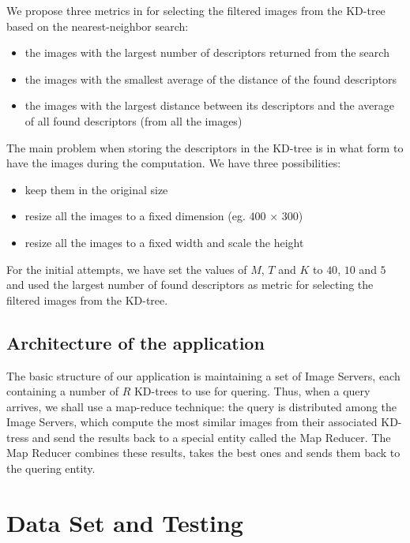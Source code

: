\documentclass[conference]{IEEEtran}
\begin{document}
We propose three metrics in for selecting the filtered images from the KD-tree based on the nearest-neighbor search:
\begin{itemize}
	\item the images with the largest number of descriptors returned from the search
	\item the images with the smallest average of the distance of the found descriptors
	\item the images with the largest distance between its descriptors and the average of all found descriptors (from all the images)
\end{itemize}

The main problem when storing the descriptors in the KD-tree is in what form to have the images during the computation. We have three possibilities:
\begin{itemize}
	\item keep them in the original size
	\item resize all the images to a fixed dimension (eg. 400 × 300)
	\item resize all the images to a fixed width and scale the height
\end{itemize}

For the initial attempts, we have set the values of $M$, $T$ and $K$ to $40$, $10$ and $5$ and used the largest number of found descriptors as metric for selecting the filtered images from the KD-tree.\\

\subsection{Architecture of the application}
The basic structure of our application is maintaining a set of Image Servers, each containing a number of $R$ KD-trees to use for quering.
Thus, when a query arrives, we shall use a map-reduce technique: the query is distributed among the Image Servers, which compute the most similar images from their associated KD-tress and send the results back to a special entity called the Map Reducer. The Map Reducer combines these results, takes the best ones and sends them back to the quering entity.
 
\section{Data Set and Testing}
\end{document}
